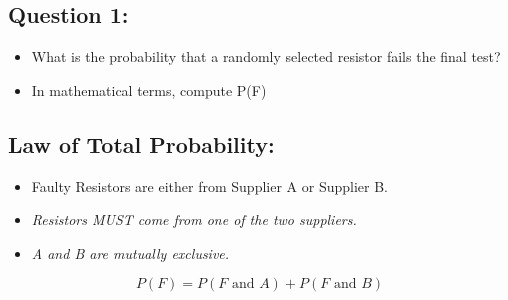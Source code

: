 \documentclass[]{report}
\begin{document}
\subsection*{Question 1:}
\begin{itemize}
\item What is the probability that a randomly selected resistor fails the final test?

\item In mathematical terms, compute P(F) 
\end{itemize}


\subsection*{Law of Total Probability:}
\begin{itemize}
\item Faulty Resistors are either from Supplier A or Supplier B.
\vspace{0.3cm} 
\item \textit{Resistors MUST come from one of the two suppliers.}
\item \textit{A and B are mutually exclusive.}
\end{itemize}

\[ P(F) = P(F \mbox{ and } A) + P(F \mbox{ and } B) \]
\end{document}
